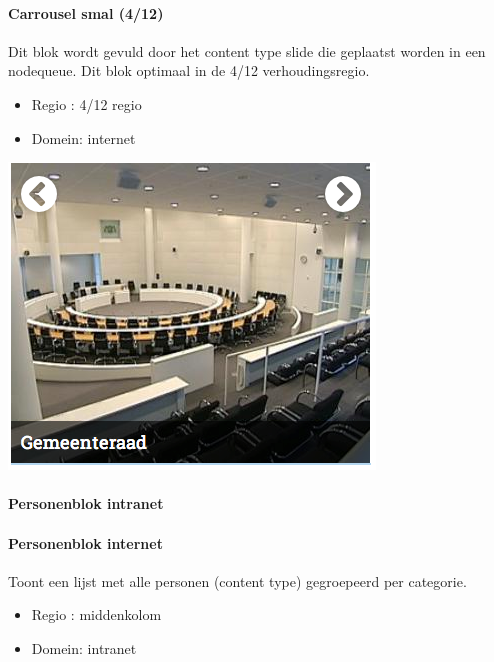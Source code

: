\paragraph{Carrousel smal (4/12)}

Dit blok wordt gevuld door het content type slide die geplaatst worden in een nodequeue. Dit blok optimaal in de 4/12 verhoudingsregio.

\begin{itemize}
\item Regio : 4/12 regio
\item Domein: internet
\end{itemize}

\begin{center}
	\includegraphics[scale=0.5]{img/blokken/carrouselsmal.png}
\end{center}

\paragraph{Personenblok intranet}

\paragraph{Personenblok internet}\label{personenblokinternet}

Toont een lijst met alle personen (content type) gegroepeerd per categorie.

\begin{itemize}
\item Regio : middenkolom
\item Domein: intranet
\end{itemize}

